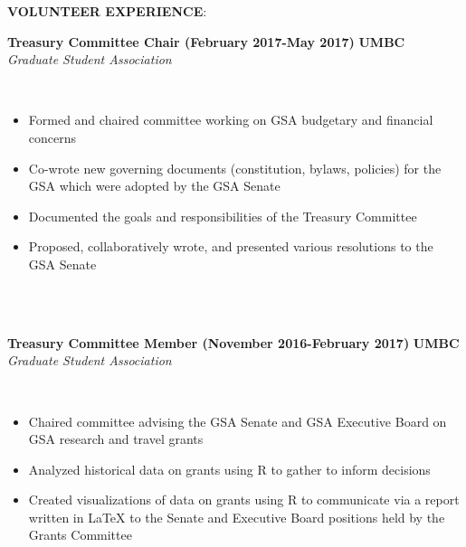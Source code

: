 \documentclass{article}
\begin{document}
\noindent \textbf{VOLUNTEER EXPERIENCE}:\\
\begin{vwcol}[widths={0.8,0.2}, sep=.8cm, justify=flush, rule=0pt, indent=0em]
\noindent \textbf{Treasury Committee Chair (February 2017-May 2017)}
\newpage
\noindent \textbf{UMBC}\\
\noindent \emph{Graduate Student Association}
\end{vwcol}
\phantom \\
\begin{itemize}
\item Formed and chaired committee working on GSA budgetary and financial concerns
\item Co-wrote new governing documents (constitution, bylaws, policies) for the GSA which were adopted by the GSA Senate
\item Documented the goals and responsibilities of the Treasury Committee
\item Proposed, collaboratively wrote, and presented various resolutions to the GSA Senate
\end{itemize}
\phantom \\
\phantom \\
%
%
%
%
\begin{vwcol}[widths={0.8,0.2}, sep=.8cm, justify=flush, rule=0pt, indent=0em]
\noindent \textbf{Treasury Committee Member (November 2016-February 2017)}
\newpage
\noindent \textbf{UMBC}\\
\noindent \emph{Graduate Student Association}
\end{vwcol}
\phantom \\
\begin{itemize}
\item Chaired committee advising the GSA Senate and GSA Executive Board on GSA research and travel grants
\item Analyzed historical data on grants using R to gather to inform decisions
\item Created visualizations of data on grants using R to communicate via a report written in LaTeX to the Senate and Executive Board positions held by the Grants Committee
\end{itemize}
\end{document}

